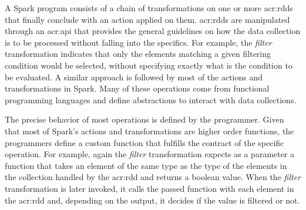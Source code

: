 \label{sec:conceptual-process}






A Spark program consists of a chain of transformations on one or more \acrshort{acr:rdd}s that finally conclude with an action applied on them. \acrshort{acr:rdd}s are manipulated through an \acrshort{acr:api} that provides the general guidelines on how the data collection is to be processed without falling into the specifics. For example, the \textit{filter} transformation indicates that only the elements matching a given filtering condition would be selected, without specifying exactly what is the condition to be evaluated. A similar approach is followed by most of the actions and transformations in Spark. Many of these operations come from functional programming languages and define abstractions to interact with data collections.

The precise behavior of most operations is defined by the programmer. Given that most of Spark's actions and transformations are higher order functions, the programmers define a custom function that fulfills the contract of the specific operation. For example, again the \textit{filter} transformation expects as a parameter a function that takes an element of the same type as the type of the elements in the collection handled by the \acrshort{acr:rdd} and returns a boolean value. When the \textit{filter} transformation is later invoked, it calls the passed function with each element in the \acrshort{acr:rdd} and, depending on the output, it decides if the value is filtered or not.


